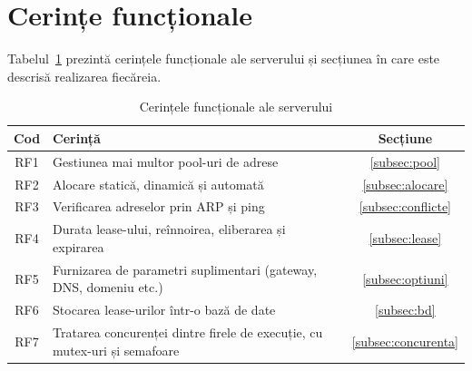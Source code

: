\documentclass[conference]{IEEEtran}
\begin{document}
\section{Cerințe funcționale}\label{sec:cerinte}
Tabelul~\ref{tab:cerinte} prezintă cerințele funcționale ale serverului și secțiunea în care este descrisă realizarea fiecăreia.

\begin{table}[htbp]
\caption{Cerințele funcționale ale serverului}
\begin{center}
\begin{tabular}{|c|p{5.3cm}|c|}
\hline
\textbf{Cod} & \textbf{Cerință} & \textbf{Secțiune} \\
\hline
RF1 & Gestiunea mai multor pool-uri de adrese & \ref{subsec:pool} \\
\hline
RF2 & Alocare statică, dinamică și automată & \ref{subsec:alocare} \\
\hline
RF3 & Verificarea adreselor prin ARP și ping & \ref{subsec:conflicte} \\
\hline
RF4 & Durata lease-ului, reînnoirea, eliberarea și expirarea & \ref{subsec:lease} \\
\hline
RF5 & Furnizarea de parametri suplimentari (gateway, DNS, domeniu etc.) & \ref{subsec:optiuni} \\
\hline
RF6 & Stocarea lease-urilor într-o bază de date & \ref{subsec:bd} \\
\hline
RF7 & Tratarea concurenței dintre firele de execuție, cu mutex-uri și semafoare & \ref{subsec:concurenta} \\
\hline
\end{tabular}
\label{tab:cerinte}
\end{center}
\end{table}
\end{document}
